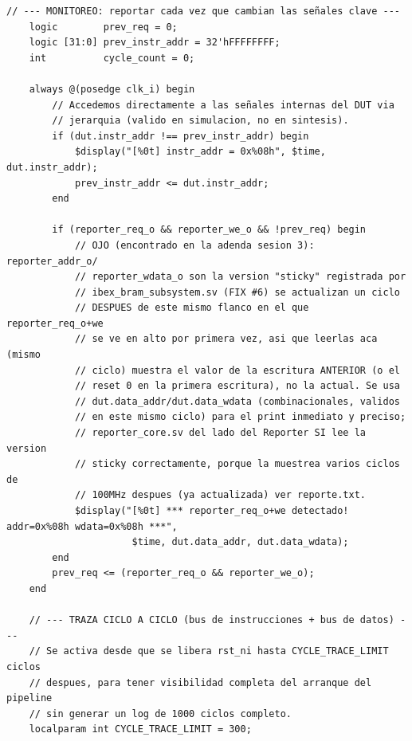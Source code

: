 \begin{lstlisting}[style=verilogstyle, basicstyle=\ttfamily\footnotesize, caption={Código fuente del subsistema \texttt{tb\_ibex\_bram\_subsystem.sv}}, label={code:tb_ibex_bram_subsystem.sv}]
    // --- MONITOREO: reportar cada vez que cambian las señales clave ---
    logic        prev_req = 0;
    logic [31:0] prev_instr_addr = 32'hFFFFFFFF;
    int          cycle_count = 0;

    always @(posedge clk_i) begin
        // Accedemos directamente a las señales internas del DUT via
        // jerarquia (valido en simulacion, no en sintesis).
        if (dut.instr_addr !== prev_instr_addr) begin
            $display("[%0t] instr_addr = 0x%08h", $time, dut.instr_addr);
            prev_instr_addr <= dut.instr_addr;
        end

        if (reporter_req_o && reporter_we_o && !prev_req) begin
            // OJO (encontrado en la adenda sesion 3): reporter_addr_o/
            // reporter_wdata_o son la version "sticky" registrada por
            // ibex_bram_subsystem.sv (FIX #6) se actualizan un ciclo
            // DESPUES de este mismo flanco en el que reporter_req_o+we
            // se ve en alto por primera vez, asi que leerlas aca (mismo
            // ciclo) muestra el valor de la escritura ANTERIOR (o el
            // reset 0 en la primera escritura), no la actual. Se usa
            // dut.data_addr/dut.data_wdata (combinacionales, validos
            // en este mismo ciclo) para el print inmediato y preciso;
            // reporter_core.sv del lado del Reporter SI lee la version
            // sticky correctamente, porque la muestrea varios ciclos de
            // 100MHz despues (ya actualizada) ver reporte.txt.
            $display("[%0t] *** reporter_req_o+we detectado! addr=0x%08h wdata=0x%08h ***",
                      $time, dut.data_addr, dut.data_wdata);
        end
        prev_req <= (reporter_req_o && reporter_we_o);
    end

    // --- TRAZA CICLO A CICLO (bus de instrucciones + bus de datos) ---
    // Se activa desde que se libera rst_ni hasta CYCLE_TRACE_LIMIT ciclos
    // despues, para tener visibilidad completa del arranque del pipeline
    // sin generar un log de 1000 ciclos completo.
    localparam int CYCLE_TRACE_LIMIT = 300;


\end{lstlisting}
